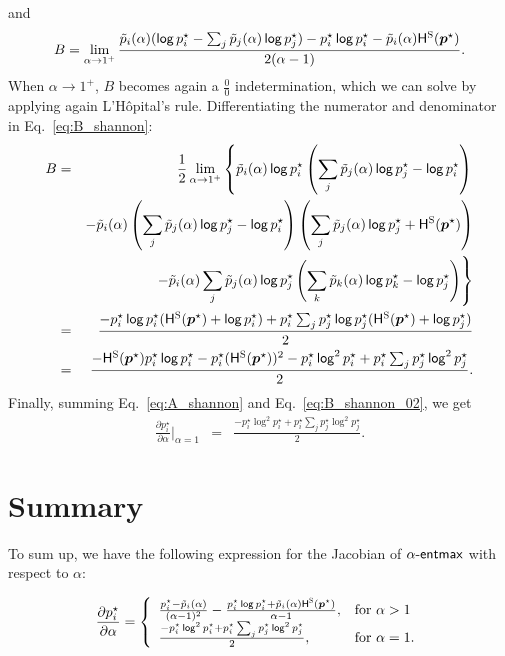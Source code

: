 and
\begin{equation}\label{eq:B_shannon}
    B = \lim_{\alpha \rightarrow 1^+} \frac{\tilde{p}_i(\alpha) (\operatorname*{\mathsf{log}} p_i^{\star} - \sum_j \tilde{p}_j(\alpha) \operatorname*{\mathsf{log}} p_j^{\star}) - p_i^{\star}\operatorname*{\mathsf{log}} p_i^{\star} - \tilde{p}_i(\alpha) \mathsf{H}^\textsc{S}(\bm{p}^{\star})}{2(\alpha-1)}.
\end{equation}
When $\alpha\rightarrow 1^+$, $B$ becomes again a $\frac{0}{0}$ indetermination, which we can solve by applying again L'H\^opital's rule. Differentiating the numerator and denominator in Eq.~\ref{eq:B_shannon}:
\begin{eqnarray}\label{eq:B_shannon_02}
    B &=& \frac{1}{2}\lim_{\alpha \rightarrow 1^+} \left\{ \tilde{p}_i(\alpha) \operatorname*{\mathsf{log}} p_i^{\star} \left(\sum_j \tilde{p}_j(\alpha) \operatorname*{\mathsf{log}} p_j^{\star} - \operatorname*{\mathsf{log}} p_i^{\star}\right) \right. \nonumber\\
    && - \tilde{p}_i(\alpha) \left(\sum_j \tilde{p}_j(\alpha) \operatorname*{\mathsf{log}} p_j^{\star} - \operatorname*{\mathsf{log}} p_i^{\star}\right) \left(\sum_j \tilde{p}_j(\alpha) \operatorname*{\mathsf{log}} p_j^{\star} + \mathsf{H}^\textsc{S}(\bm{p}^{\star})\right) \nonumber\\
    && \left. - \tilde{p}_i(\alpha) \sum_j \tilde{p}_j(\alpha) \operatorname*{\mathsf{log}} p_j^{\star} \left(\sum_k \tilde{p}_k(\alpha) \operatorname*{\mathsf{log}} p_k^{\star} - \operatorname*{\mathsf{log}} p_j^{\star}\right)\right\}\nonumber\\
    &=& \frac{-p_i^{\star} \operatorname*{\mathsf{log}} p_i^{\star}(\mathsf{H}^\textsc{S}(\bm{p}^{\star}) + \operatorname*{\mathsf{log}} p_i^{\star})
    +p_i^{\star} \sum_j p_j^{\star} \operatorname*{\mathsf{log}} p_j^{\star}(\mathsf{H}^\textsc{S}(\bm{p}^{\star}) + \operatorname*{\mathsf{log}} p_j^{\star})}{2}\nonumber\\
    &=& \frac{-\mathsf{H}^\textsc{S}(\bm{p}^{\star}) p_i^{\star}\operatorname*{\mathsf{log}} p_i^{\star} - p_i^{\star} (\mathsf{H}^\textsc{S}(\bm{p}^{\star}))^2 - p_i^{\star}\operatorname*{\mathsf{log}}^2 p_i^{\star} + p_i^{\star} \sum_j p_j^{\star}\operatorname*{\mathsf{log}}^2 p_j^{\star}}{2}.
\end{eqnarray}
Finally, summing Eq.~\ref{eq:A_shannon} and Eq.~\ref{eq:B_shannon_02}, we get
\begin{eqnarray}\label{eq:gradient_alpha_shannon_02}
    \frac{\partial p_i^{\star}}{\partial \alpha}\bigg|_{\alpha=1} &=& \frac{- p_i^{\star}\log^2 p_i^{\star} + p_i^{\star} \sum_j p_j^{\star}\log^2 p_j^{\star}}{2}.
\end{eqnarray}

\section*{Summary}

To sum up, we have the following expression for the Jacobian of $\mathop{\mathsf{\alpha}\textnormal{-}\mathsf{entmax}}$ with respect to $\alpha$:

\begin{equation}\label{eq:final_gradient_alpha_supp}
    \frac{\partial p_i^{\star}}{\partial \alpha} =
    \left\{
    \begin{array}{ll}
        \frac{p_i^{\star} - \tilde{p}_i(\alpha)}{(\alpha-1)^2} - \frac{p_i^{\star}\operatorname*{\mathsf{log}} p_i^{\star} + \tilde{p}_i(\alpha)\mathsf{H}^\textsc{S}(\bm{p}^{\star})}{\alpha-1}, & \text{for $\alpha > 1$}  \\
        \frac{- p_i^{\star}\operatorname*{\mathsf{log}}^2 p_i^{\star} + p_i^{\star} \sum_j p_j^{\star}\operatorname*{\mathsf{log}}^2 p_j^{\star}}{2},                                                    & \text{for $\alpha = 1$.}
    \end{array}
    \right.
\end{equation}

\singlespacing